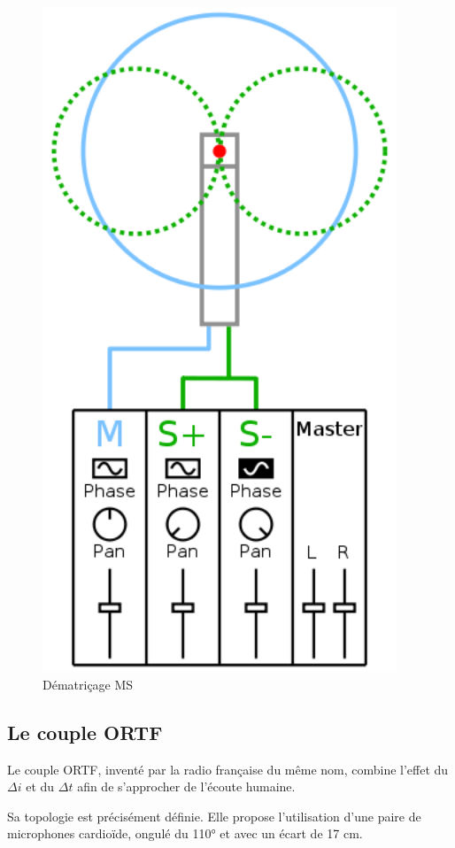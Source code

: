 \documentclass[
]{book}
\begin{document}
\begin{figure}
\includegraphics[width=4.17in]{_resources/171f157be4749ac8446dd9bdfff0625b} \caption{Dématriçage MS}\label{fig:chunk-label}
\end{figure}

\hypertarget{le-couple-ortf}{%
\subsection{Le couple ORTF}\label{le-couple-ortf}}

Le couple ORTF, inventé par la radio française du même nom, combine l'effet du \(\Delta i\) et du \(\Delta t\) afin de s'approcher de l'écoute humaine.

Sa topologie est précisément définie. Elle propose l'utilisation d'une paire de microphones cardioïde, ongulé du 110° et avec un écart de 17 cm.
\end{document}

